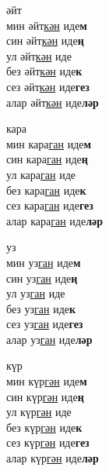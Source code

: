 \begin{multicols}{4}
\begin{enumerate}
\begin{minipage}{\linewidth}
    \item
    әйт\\
    мин әйт\underline{кән} иде\textbf{м}\\
    син әйт\underline{кән} иде\textbf{ң}\\
    ул әйт\underline{кән} иде\\
    без әйт\underline{кән} иде\textbf{к}\\
    сез әйт\underline{кән} иде\textbf{гез}\\
    алар әйт\underline{кән} иде\textbf{ләр}\\
\end{minipage}

\begin{minipage}{\linewidth}
    \item
    кара\\
    мин кара\underline{ган} иде\textbf{м}\\
    син кара\underline{ган} иде\textbf{ң}\\
    ул кара\underline{ган} иде\\
    без кара\underline{ган} иде\textbf{к}\\
    сез кара\underline{ган} иде\textbf{гез}\\
    алар кара\underline{ган} иде\textbf{ләр}\\
\end{minipage}

\begin{minipage}{\linewidth}
    \item
    уз\\
    мин уз\underline{ган} иде\textbf{м}\\
    син уз\underline{ган} иде\textbf{ң}\\
    ул уз\underline{ган} иде\\
    без уз\underline{ган} иде\textbf{к}\\
    сез уз\underline{ган} иде\textbf{гез}\\
    алар уз\underline{ган} иде\textbf{ләр}\\
\end{minipage}

\begin{minipage}{\linewidth}
    \item
    күр\\
    мин күр\underline{гән} иде\textbf{м}\\
    син күр\underline{гән} иде\textbf{ң}\\
    ул күр\underline{гән} иде\\
    без күр\underline{гән} иде\textbf{к}\\
    сез күр\underline{гән} иде\textbf{гез}\\
    алар күр\underline{гән} иде\textbf{ләр}\\
\end{minipage}


\end{enumerate}
\end{multicols}
